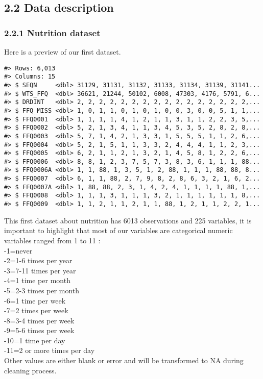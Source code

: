 \documentclass[
]{article}
\begin{document}
\hypertarget{data-description}{%
\subsection{2.2 Data description}\label{data-description}}

\hypertarget{nutrition-dataset}{%
\subsubsection{2.2.1 Nutrition dataset}\label{nutrition-dataset}}

Here is a preview of our first dataset.

\begin{verbatim}
#> Rows: 6,013
#> Columns: 15
#> $ SEQN     <dbl> 31129, 31131, 31132, 31133, 31134, 31139, 31141...
#> $ WTS_FFQ  <dbl> 36621, 21244, 50102, 6008, 47303, 4176, 5791, 6...
#> $ DRDINT   <dbl> 2, 2, 2, 2, 2, 2, 2, 2, 2, 2, 2, 2, 2, 2, 2, 2,...
#> $ FFQ_MISS <dbl> 1, 0, 1, 1, 0, 1, 0, 1, 0, 0, 3, 0, 0, 5, 1, 1,...
#> $ FFQ0001  <dbl> 1, 1, 1, 1, 4, 1, 2, 1, 1, 3, 1, 1, 2, 2, 3, 5,...
#> $ FFQ0002  <dbl> 5, 2, 1, 3, 4, 1, 1, 3, 4, 5, 3, 5, 2, 8, 2, 8,...
#> $ FFQ0003  <dbl> 5, 7, 1, 4, 2, 1, 3, 3, 1, 5, 5, 5, 1, 1, 2, 6,...
#> $ FFQ0004  <dbl> 5, 2, 1, 5, 1, 1, 3, 3, 2, 4, 4, 4, 1, 1, 2, 3,...
#> $ FFQ0005  <dbl> 6, 2, 1, 1, 2, 1, 3, 2, 1, 4, 5, 8, 1, 2, 2, 6,...
#> $ FFQ0006  <dbl> 8, 8, 1, 2, 3, 7, 5, 7, 3, 8, 3, 6, 1, 1, 1, 88...
#> $ FFQ0006A <dbl> 1, 1, 88, 1, 3, 5, 1, 2, 88, 1, 1, 1, 88, 88, 8...
#> $ FFQ0007  <dbl> 6, 1, 1, 88, 2, 7, 9, 8, 2, 8, 6, 3, 2, 1, 6, 2...
#> $ FFQ0007A <dbl> 1, 88, 88, 2, 3, 1, 4, 2, 4, 1, 1, 1, 1, 88, 1,...
#> $ FFQ0008  <dbl> 1, 1, 1, 3, 1, 1, 1, 3, 2, 1, 1, 1, 1, 1, 1, 8,...
#> $ FFQ0009  <dbl> 1, 1, 2, 1, 1, 2, 1, 1, 88, 1, 2, 1, 1, 2, 2, 1...
\end{verbatim}

This first dataset about nutrition has 6013 observations and 225
variables, it is important to highlight that most of our variables are
categorical numeric variables ranged from 1 to 11 :\\
-1=never\\
-2=1-6 times per year\\
-3=7-11 times per year\\
-4=1 time per month\\
-5=2-3 times per month\\
-6=1 time per week\\
-7=2 times per week\\
-8=3-4 times per week\\
-9=5-6 times per week\\
-10=1 time per day\\
-11=2 or more times per day\\
Other values are either blank or error and will be transformed to NA
during cleaning process.
\end{document}
